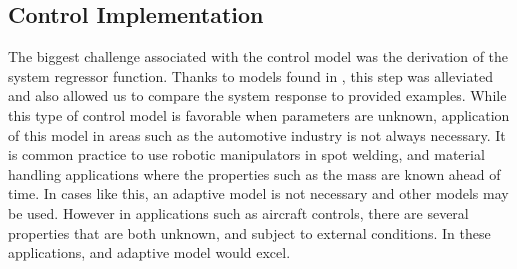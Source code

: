 \subsection*{Control Implementation}
The biggest challenge associated with the control model was the derivation of the system regressor function. Thanks to models found in \autocite{lewis2003robot}, this step was alleviated and also allowed us to compare the system response to provided examples. While this type of control model is favorable when parameters are unknown, application of this model in areas such as the automotive industry is not always necessary. It is common practice to use robotic manipulators in spot welding, and material handling applications where the properties such as the mass are known ahead of time. In cases like this, an adaptive model is not necessary and other models may be used. However in applications such as aircraft controls, there are several properties that are both unknown, and subject to external conditions. In these applications, and adaptive model would excel.